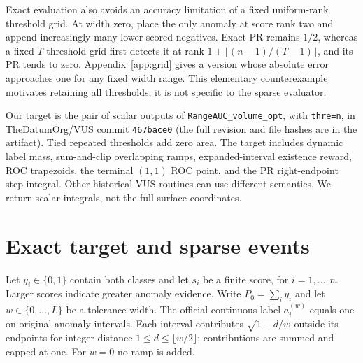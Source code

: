 Exact evaluation also avoids an accuracy limitation of a fixed uniform-rank
threshold grid. At width zero, place the only anomaly at score rank two and
append increasingly many lower-scored negatives. Exact PR remains $1/2$,
whereas a fixed $T$-threshold grid first detects it at rank
$1+\lfloor(n-1)/(T-1)\rfloor$, and its PR tends to zero. Appendix~\ref{app:grid}
gives a version whose absolute error approaches one for any fixed width range.
This elementary counterexample motivates retaining all thresholds; it is not
specific to the sparse evaluator.

Our target is the pair of scalar outputs of
\texttt{RangeAUC\_\allowbreak volume\_\allowbreak opt}, with \texttt{thre=n}, in TheDatumOrg/VUS commit
\texttt{467bace0} (the full revision and file hashes are in the artifact).
Tied repeated thresholds add
zero area. The target includes dynamic label mass, sum-and-clip overlapping
ramps, expanded-interval existence reward, ROC trapezoids, the terminal
$(1,\allowbreak 1)$ ROC point, and the PR right-endpoint step integral. Other historical
VUS routines can use different semantics. We return scalar integrals, not the
full surface coordinates.

\section{Exact target and sparse events}
Let $y_i\in\{0,\allowbreak 1\}$ contain both classes and let $s_i$ be a finite score, for
$i=1,\allowbreak \ldots,\allowbreak n$. Larger scores indicate greater anomaly evidence. Write
$P_0=\sum_i y_i$ and let $w\in\{0,\allowbreak \ldots,\allowbreak L\}$ be a tolerance width. The
official continuous label $a_i^{(w)}$ equals one on original anomaly intervals.
Each interval contributes $\sqrt{1-d/w}$ outside its endpoints for integer
distance $1\le d\le\lfloor w/2\rfloor$; contributions are summed and capped at
one. For $w=0$ no ramp is added.

